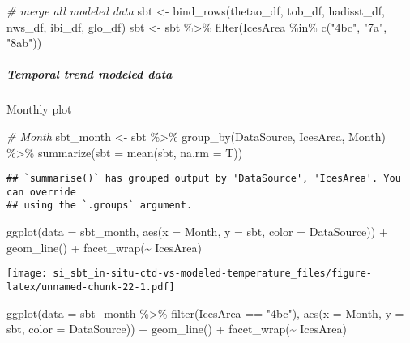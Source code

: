 \documentclass[
]{article}
\newenvironment{Shaded}{\begin{snugshade}}{\end{snugshade}}
\newcommand{\AttributeTok}[1]{\textcolor[rgb]{0.77,0.63,0.00}{#1}}
\newcommand{\CommentTok}[1]{\textcolor[rgb]{0.56,0.35,0.01}{\textit{#1}}}
\newcommand{\FunctionTok}[1]{\textcolor[rgb]{0.00,0.00,0.00}{#1}}
\newcommand{\NormalTok}[1]{#1}
\newcommand{\OtherTok}[1]{\textcolor[rgb]{0.56,0.35,0.01}{#1}}
\newcommand{\SpecialCharTok}[1]{\textcolor[rgb]{0.00,0.00,0.00}{#1}}
\newcommand{\StringTok}[1]{\textcolor[rgb]{0.31,0.60,0.02}{#1}}
\begin{document}
\begin{Shaded}
\begin{Highlighting}[]
\CommentTok{\# merge all modeled data}
\NormalTok{sbt }\OtherTok{\textless{}{-}} \FunctionTok{bind\_rows}\NormalTok{(thetao\_df, tob\_df, hadisst\_df, nws\_df, ibi\_df, glo\_df)}
\NormalTok{sbt }\OtherTok{\textless{}{-}}\NormalTok{ sbt }\SpecialCharTok{\%\textgreater{}\%} \FunctionTok{filter}\NormalTok{(IcesArea }\SpecialCharTok{\%in\%} \FunctionTok{c}\NormalTok{(}\StringTok{"4bc"}\NormalTok{, }\StringTok{"7a"}\NormalTok{, }\StringTok{"8ab"}\NormalTok{))}
\end{Highlighting}
\end{Shaded}

\hypertarget{temporal-trend-modeled-data}{%
\subparagraph{Temporal trend modeled
data}\label{temporal-trend-modeled-data}}

Monthly plot

\begin{Shaded}
\begin{Highlighting}[]
\CommentTok{\# Month}
\NormalTok{sbt\_month }\OtherTok{\textless{}{-}}\NormalTok{ sbt }\SpecialCharTok{\%\textgreater{}\%} \FunctionTok{group\_by}\NormalTok{(DataSource, IcesArea, Month) }\SpecialCharTok{\%\textgreater{}\%} \FunctionTok{summarize}\NormalTok{(}\AttributeTok{sbt =} \FunctionTok{mean}\NormalTok{(sbt, }\AttributeTok{na.rm =}\NormalTok{ T))}
\end{Highlighting}
\end{Shaded}

\begin{verbatim}
## `summarise()` has grouped output by 'DataSource', 'IcesArea'. You can override
## using the `.groups` argument.
\end{verbatim}

\begin{Shaded}
\begin{Highlighting}[]
\FunctionTok{ggplot}\NormalTok{(}\AttributeTok{data =}\NormalTok{ sbt\_month, }\FunctionTok{aes}\NormalTok{(}\AttributeTok{x =}\NormalTok{ Month, }\AttributeTok{y =}\NormalTok{ sbt, }\AttributeTok{color =}\NormalTok{ DataSource)) }\SpecialCharTok{+} \FunctionTok{geom\_line}\NormalTok{() }\SpecialCharTok{+} \FunctionTok{facet\_wrap}\NormalTok{(}\SpecialCharTok{\textasciitilde{}}\NormalTok{ IcesArea)}
\end{Highlighting}
\end{Shaded}

\texttt{[image: si\_sbt\_in-situ-ctd-vs-modeled-temperature\_files/figure-latex/unnamed-chunk-22-1.pdf]}

\begin{Shaded}
\begin{Highlighting}[]
\FunctionTok{ggplot}\NormalTok{(}\AttributeTok{data =}\NormalTok{ sbt\_month }\SpecialCharTok{\%\textgreater{}\%} \FunctionTok{filter}\NormalTok{(IcesArea }\SpecialCharTok{==} \StringTok{"4bc"}\NormalTok{), }\FunctionTok{aes}\NormalTok{(}\AttributeTok{x =}\NormalTok{ Month, }\AttributeTok{y =}\NormalTok{ sbt, }\AttributeTok{color =}\NormalTok{ DataSource)) }\SpecialCharTok{+} \FunctionTok{geom\_line}\NormalTok{() }\SpecialCharTok{+} \FunctionTok{facet\_wrap}\NormalTok{(}\SpecialCharTok{\textasciitilde{}}\NormalTok{ IcesArea)}
\end{Highlighting}
\end{Shaded}
\end{document}

